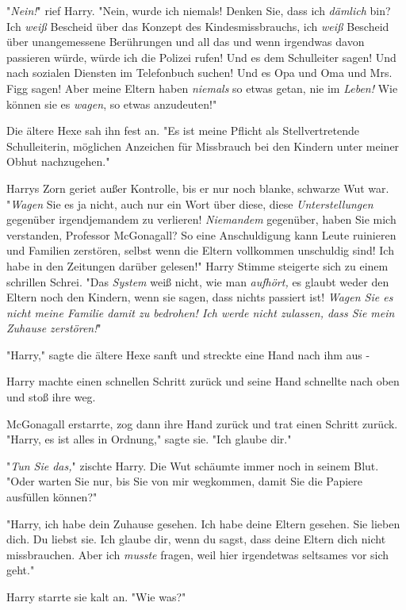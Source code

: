 {"\emph{Nein!}" rief Harry. "Nein, wurde ich niemals! Denken Sie, dass ich \emph{dämlich} bin? Ich \emph{weiß} Bescheid über das Konzept des Kindesmissbrauchs, ich \emph{weiß} Bescheid über unangemessene Berührungen und all das und wenn irgendwas davon passieren würde, würde ich die Polizei rufen! Und es dem Schulleiter sagen! Und nach sozialen Diensten im Telefonbuch suchen! Und es Opa und Oma und Mrs. Figg sagen! Aber meine Eltern haben \emph{niemals} so etwas getan, nie im \emph{Leben!} Wie können sie es \emph{wagen}, so etwas anzudeuten!"

Die ältere Hexe sah ihn fest an. "Es ist meine Pflicht als Stellvertretende Schulleiterin, möglichen Anzeichen für Missbrauch bei den Kindern unter meiner Obhut nachzugehen."

Harrys Zorn geriet außer Kontrolle, bis er nur noch blanke, schwarze Wut war. "\emph{Wagen} Sie es ja nicht, auch nur ein Wort über diese, diese \emph{Unterstellungen} gegenüber irgendjemandem zu verlieren! \emph{Niemandem} gegenüber, haben Sie mich verstanden, Professor McGonagall? So eine Anschuldigung kann Leute ruinieren und Familien zerstören, selbst wenn die Eltern vollkommen unschuldig sind! Ich habe in den Zeitungen darüber gelesen!" Harry Stimme steigerte sich zu einem schrillen Schrei. "Das \emph{System} weiß nicht, wie man \emph{aufhört,} es glaubt weder den Eltern noch den Kindern, wenn sie sagen, dass nichts passiert ist! \emph{Wagen Sie es nicht meine Familie damit zu bedrohen! Ich werde nicht zulassen, dass Sie mein} \emph{Zuhause zerstören!}"

"Harry," sagte die ältere Hexe sanft und streckte eine Hand nach ihm aus -

Harry machte einen schnellen Schritt zurück und seine Hand schnellte nach oben und stoß ihre weg.

McGonagall erstarrte, zog dann ihre Hand zurück und trat einen Schritt zurück. "Harry, es ist alles in Ordnung," sagte sie. "Ich glaube dir."

"\emph{Tun Sie das,}" zischte Harry. Die Wut schäumte immer noch in seinem Blut. "Oder warten Sie nur, bis Sie von mir wegkommen, damit Sie die Papiere ausfüllen können?"

"Harry, ich habe dein Zuhause gesehen. Ich habe deine Eltern gesehen. Sie lieben dich. Du liebst sie. Ich glaube dir, wenn du sagst, dass deine Eltern dich nicht missbrauchen. Aber ich \emph{musste} fragen, weil hier irgendetwas seltsames vor sich geht."

Harry starrte sie kalt an. "Wie was?"

}
